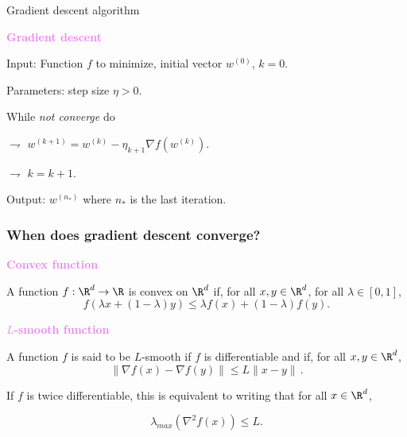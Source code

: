 \documentclass[xcolor={usenames,dvipsnames}]{beamer}
\begin{document}
\begin{frame}{Gradient descent algorithm}
	


\textbf{\textcolor{violet}{Gradient descent}}
		
\alert{Input}: Function $f$ to minimize, initial vector $w^{(0)}$, $k=0$.

\medskip 
	
	
\alert{Parameters}: step size $\eta>0$.

\medskip
	
While \textit{not converge} do


\hspace{2cm} $\rightharpoondown$ $w^{(k+1)} = w^{(k)} - \eta_{k+1} \nabla f(w^{(k)})$.

\hspace{2cm} $\rightharpoondown$ $k = k+1$.

\medskip

\alert{Output}: $w^{(n_*)}$ where $n_*$ is the last iteration.

	
\end{frame}




\begin{frame}
	\frametitle{When does gradient descent converge?}
	
\textbf{\textcolor{violet}{Convex function}}

A function $f : \R^d \to \R$ is \alert{convex} on $\R^d$ if, for all $x, y \in \R^d$, for all $\lambda \in [0,1]$,
$$
f(\lambda x + (1- \lambda) y ) \leq \lambda f(x) + (1 - \lambda) f(y).
$$	
	

\vspace{.4cm}
	
\textbf{\textcolor{violet}{$L$-smooth function}}

A function $f$ is said to be \alert{$L$-smooth} if $f$ is differentiable and if, for all $x, y \in \R^d$, 
$$
\| \nabla f(x) - \nabla f(y) \| \leqslant L \|x-y\|\,.
$$
	
If $f$ is \alert{twice differentiable}, this is equivalent to writing that for all $x \in \R^d$,  
	
$$
\lambda_{max} (\nabla^2 f(x)) \leqslant L.
$$
	
\end{frame}
\end{document}
